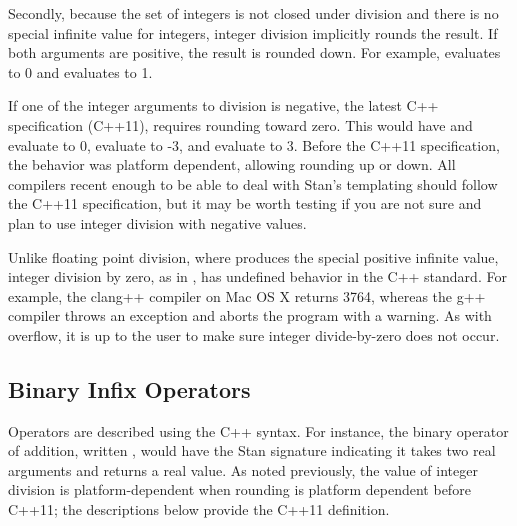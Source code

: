 Secondly, because the set of integers is not closed under division and there is no special infinite value for integers, integer division implicitly rounds the result.  If both arguments are positive, the result is rounded down.  For example,  evaluates to 0 and  evaluates to 1.

If one of the integer arguments to division is negative, the latest C++ specification (C++11), requires rounding toward zero.  This would have  and  evaluate to 0,  evaluate to -3, and  evaluate to 3.  Before the C++11 specification, the behavior was platform dependent, allowing rounding up or down.  All compilers recent enough to be able to deal with Stan's templating should follow the C++11 specification, but it may be worth testing if you are not sure and plan to use integer division with negative values.

Unlike floating point division, where  produces the special positive infinite value, integer division by zero, as in , has undefined behavior in the C++ standard.  For example, the clang++ compiler on Mac OS X returns 3764, whereas the g++ compiler throws an exception and aborts the program with a warning.  As with overflow, it is up to the user to make sure integer divide-by-zero does not occur.

\subsection{Binary Infix Operators}

Operators are described using the C++ syntax.  For instance, the binary operator of addition, written , would have the Stan signature  indicating it takes two real arguments and returns a real value.  As noted previously, the value of integer division is platform-dependent when rounding is platform dependent before C++11;  the descriptions below provide the C++11 definition.

